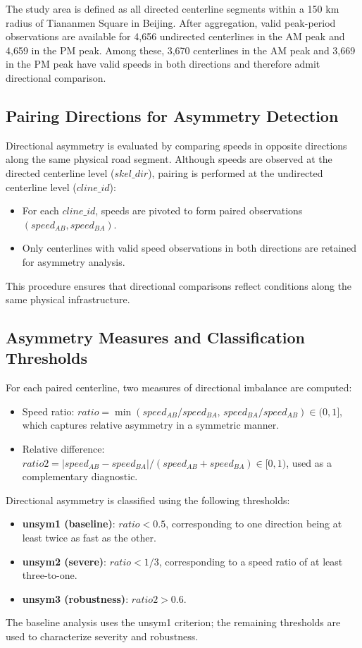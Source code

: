 \documentclass[12pt]{article}
\begin{document}
	The study area is defined as all directed centerline segments within a 150 km radius of Tiananmen Square in Beijing. After aggregation, valid peak-period observations are available for 4,656 undirected centerlines in the AM peak and 4,659 in the PM peak. Among these, 3,670 centerlines in the AM peak and 3,669 in the PM peak have valid speeds in both directions and therefore admit directional comparison.
	
	\subsection{Pairing Directions for Asymmetry Detection}
	
	Directional asymmetry is evaluated by comparing speeds in opposite directions along the same physical road segment. Although speeds are observed at the directed centerline level ($skel\_dir$), pairing is performed at the undirected centerline level ($cline\_id$):
	\begin{itemize}
		\item For each $cline\_id$, speeds are pivoted to form paired observations $(speed_{AB}, speed_{BA})$.
		\item Only centerlines with valid speed observations in both directions are retained for asymmetry analysis.
	\end{itemize}
	This procedure ensures that directional comparisons reflect conditions along the same physical infrastructure.
	
	\subsection{Asymmetry Measures and Classification Thresholds}
	
	For each paired centerline, two measures of directional imbalance are computed:
	\begin{itemize}
		\item Speed ratio: $ratio = \min(speed_{AB}/speed_{BA},\, speed_{BA}/speed_{AB}) \in (0,1]$, which captures relative asymmetry in a symmetric manner.
		\item Relative difference: $ratio2 = |speed_{AB} - speed_{BA}| / (speed_{AB} + speed_{BA}) \in [0,1)$, used as a complementary diagnostic.
	\end{itemize}
	
	Directional asymmetry is classified using the following thresholds:
	\begin{itemize}
		\item \textbf{unsym1 (baseline)}: $ratio < 0.5$, corresponding to one direction being at least twice as fast as the other.
		\item \textbf{unsym2 (severe)}: $ratio < 1/3$, corresponding to a speed ratio of at least three-to-one.
		\item \textbf{unsym3 (robustness)}: $ratio2 > 0.6$.
	\end{itemize}
	The baseline analysis uses the unsym1 criterion; the remaining thresholds are used to characterize severity and robustness.
	
\end{document}
